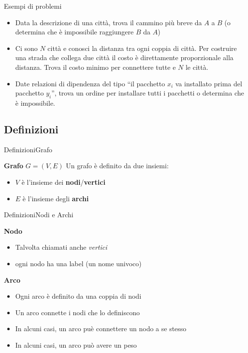 \documentclass[compress]{beamer}
\begin{document}
\begin{frame}{Esempi di problemi}
    \begin{itemize}
        \item Data la descrizione di una citt\`a, trova il cammino pi\`u breve da $A$ a $B$ (o determina che \`e impossibile raggiungere $B$ da $A$)
        \item Ci sono $N$ citt\`a e conosci la distanza tra ogni coppia di citt\`a. Per costruire una strada che collega due citt\`a il costo \`e direttamente proporzionale alla distanza. Trova il costo minimo per connettere tutte e $N$ le citt\`a.
        \item Date relazioni di dipendenza del tipo ``il pacchetto $x_i$ va installato prima del pacchetto $y_i$'', trova un ordine per installare tutti i pacchetti o determina che \`e impossibile.
    \end{itemize}
\end{frame}

\subsection{Definizioni}
\begin{frame}{Definizioni}{Grafo}
  \begin{block}{\textbf{Grafo} $G = (V, E)$}
    Un grafo \`e definito da due insiemi:
    \begin{itemize}
    \item $V$ \`e l'insieme dei \textbf{nodi}/\textbf{vertici}
    \item $E$ \`e l'insieme degli \textbf{archi}
  \end{itemize}
\end{block}
\end{frame}

\begin{frame}{Definizioni}{Nodi e Archi}
  \begin{block}{\textbf{Nodo}}
      \begin{itemize}
          \item Talvolta chiamati anche \emph{vertici}
          \item ogni nodo ha una label (un nome univoco)
    \end{itemize}
  \end{block}
  \pause
  \begin{block}{\textbf{Arco}}
      \begin{itemize}
        \item Ogni arco \`e definito da una coppia di nodi
        \item Un arco connette i nodi che lo definiscono
        \item In alcuni casi, un arco pu\`e connettere un nodo a se stesso
        \item In alcuni casi, un arco pu\`o avere un peso
  \end{itemize}
\end{block}
\end{frame}
\end{document}
